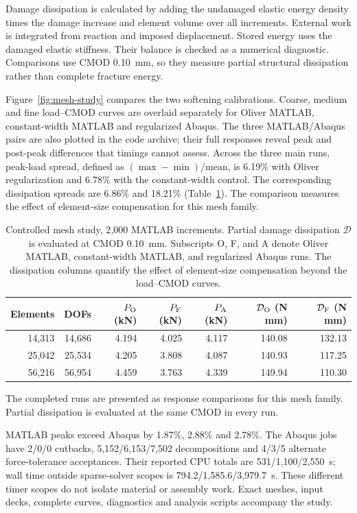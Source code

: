 \documentclass[preprint,11pt,a4paper]{elsarticle}
\begin{document}
Damage dissipation is calculated by adding the undamaged elastic energy
density times the damage increase and element volume over all increments.
External work is integrated from reaction and imposed displacement. Stored
energy uses the damaged elastic stiffness. Their balance is checked as a
numerical diagnostic. Comparisons use CMOD 0.10~mm, so they measure partial
structural dissipation rather than complete fracture energy.

Figure~\ref{fig:mesh-study} compares the two softening calibrations.
Coarse, medium and fine load--CMOD curves are overlaid separately for
Oliver MATLAB, constant-width MATLAB and regularized Abaqus. The three
MATLAB/Abaqus pairs are also plotted in the code archive; their full
responses reveal peak and post-peak differences that timings cannot assess.
Across the three main runs, peak-load spread, defined as
$(\max-\min)/\mathrm{mean}$, is 6.19\% with Oliver regularization
and 6.78\% with the constant-width control. The corresponding dissipation spreads
are 6.86\% and 18.21\% (Table~\ref{tab:mesh-study}).
The comparison measures the effect of element-size compensation for this mesh family.

\begin{table}[!htbp]
\centering\small
\caption{Controlled mesh study, 2{,}000 MATLAB increments. Partial damage
dissipation $\mathcal D$ is evaluated at CMOD 0.10~mm.
Subscripts O, F, and A denote Oliver MATLAB, constant-width MATLAB, and
regularized Abaqus runs. The dissipation columns quantify the effect of element-size compensation beyond the load--CMOD curves.}
\label{tab:mesh-study}
\begin{tabular}{rrrrrrr}
\toprule
Elements & DOFs & $P_{\rm O}$ (kN) & $P_{\rm F}$ (kN) & $P_{\rm A}$ (kN) & $\mathcal D_{\rm O}$ (N mm) & $\mathcal D_{\rm F}$ (N mm) \\
\midrule
14,313 & 14,686 & 4.194 & 4.025 & 4.117 & 140.08 & 132.13 \\
25,042 & 25,534 & 4.205 & 3.808 & 4.087 & 140.93 & 117.25 \\
56,216 & 56,954 & 4.459 & 3.763 & 4.339 & 149.94 & 110.30 \\
\bottomrule
\end{tabular}
\end{table}

The completed runs are presented as response comparisons for this mesh family. Partial dissipation is evaluated at the same CMOD in every run.

MATLAB peaks exceed Abaqus by 1.87\%, 2.88\% and 2.78\%.
The Abaqus jobs have 2/0/0 cutbacks, 5,152/6,153/7,502 decompositions
and 4/3/5 alternate force-tolerance acceptances. Their reported CPU totals
are 531/1,100/2,550~s; wall time outside sparse-solver scopes is
794.2/1,585.6/3,979.7~s. These different timer scopes do not isolate
material or assembly work. Exact meshes, input decks, complete curves,
diagnostics and analysis scripts accompany the study.
\end{document}
